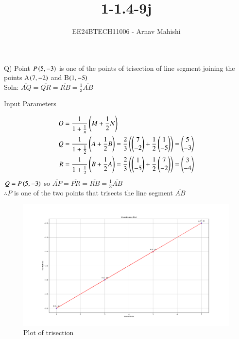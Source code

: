 \documentclass[journal]{IEEEtran}
\begin{document}

\vspace{3cm}

\title{1-1.4-9j}
\author{EE24BTECH11006 - Arnav Mahishi}
{\let\newpage\relax\maketitle}

\renewcommand{\thefigure}{\theenumi}
\renewcommand{\thetable}{\theenumi}
\setlength{\intextsep}{10pt} %


\renewcommand{\thetable}{\theenumi}

Q) Point $P\left(5,-3\right)$ is one of the points of trisection of line segment joining the points A$\left(7,-2\right)$ and B$\left(1,-5\right)$
\\Soln: $\overline{AQ}=\overline{QR}=\overline{RB}=\frac{1}{3}\overline{AB}$
\begin{table}[h!]    
  \centering
  
  \caption{Input Parameters}
\end{table}

\begin{align}
O&=\frac{1}{1+\frac{1}{n}}\left(M+\frac{1}{2}N\right)\\
Q&=\frac{1}{1+\frac{1}{2}}\left(A+\frac{1}{2}B\right)=
\frac{2}{3}\left(\begin{pmatrix}7\\-2\end{pmatrix}+\frac{1}{2}\begin{pmatrix}1\\-5\end{pmatrix}\right)=\begin{pmatrix}5\\-3\end{pmatrix}\\
R&=\frac{1}{1+\frac{1}{2}}\left(B+\frac{1}{2}A\right)=
\frac{2}{3}\left(\begin{pmatrix}1\\-5\end{pmatrix}+\frac{1}{2}\begin{pmatrix}7\\-2\end{pmatrix}\right)=\begin{pmatrix}3\\-4\end{pmatrix}
\end{align}
$Q=P\left(5,-3\right)$ so $\overline{AP}=\overline{PR}=\overline{RB}=\frac{1}{3}\overline{AB}$  \\
$\therefore P$ is one of the two points that trisects the line segment $\overline{AB}$
\begin{figure}[h!]
   \centering
   \includegraphics[width=0.7\linewidth]{figs/Figure_1.png}
   \caption{Plot of trisection}
   \label{stemplot}
\end{figure}
\end{document}
